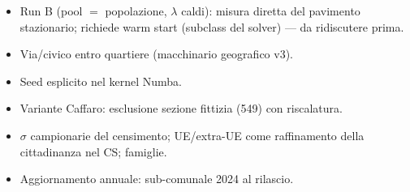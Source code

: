 \documentclass[11pt,a4paper]{article}
\begin{document}
\begin{itemize}[leftmargin=*,itemsep=1pt]
  background$\times$condizione (es.\ straniero\_immigrato vs in\_cerca).
  \item[$\square$] Run B (pool $=$ popolazione, $\lambda$ caldi): misura
  diretta del pavimento stazionario; richiede warm start (subclass del
  solver) --- da ridiscutere prima.
  \item[$\square$] Via/civico entro quartiere (macchinario geografico v3).
  \item[$\square$] Seed esplicito nel kernel Numba.
  \item[$\square$] Variante Caffaro: esclusione sezione fittizia (549) con
  riscalatura.
  \item[$\square$] $\sigma$ campionarie del censimento; UE/extra-UE come
  raffinamento della cittadinanza nel CS; famiglie.
  \item[$\square$] Aggiornamento annuale: sub-comunale 2024 al rilascio.
\end{itemize}
\end{document}
